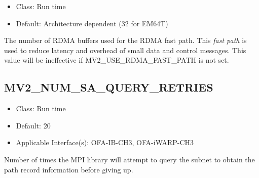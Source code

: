 \begin{itemize}
    \item Class: Run time

    \item Default: Architecture dependent (32 for EM64T)
\end{itemize}

The number of RDMA buffers used for the RDMA fast path. This \emph{fast
path} is used to reduce latency and overhead of small data and control
messages. This value will be ineffective if MV2\_USE\_RDMA\_FAST\_PATH is
not set. 

\subsection{MV2\_NUM\_SA\_QUERY\_RETRIES}
\label{def:mv2_num_sa_query_retries}
\begin{itemize}
    \item Class: Run time
    \item Default: 20
    \item Applicable Interface(s): OFA-IB-CH3, OFA-iWARP-CH3
\end{itemize}
Number of times the MPI library will attempt to query the subnet to obtain 
the path record information before giving up.



